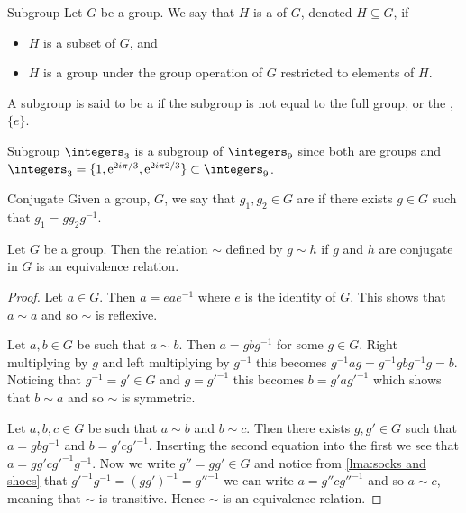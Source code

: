 \documentclass[fleqn]{NotesClass}
\newcommand{\subgroupeq}{\subseteq}
\newcommand*{\e}{\mathrm{e}}
\begin{document}
    \begin{dfn}{Subgroup}{}
        Let \(G\) be a group.
        We say that \(H\) is a  of \(G\), denoted \(H \subgroupeq G\), if
        \begin{itemize}
            \item \(H\) is a subset of \(G\), and
            \item \(H\) is a group under the group operation of \(G\) restricted to elements of \(H\).
        \end{itemize}
        A subgroup is said to be a  if the subgroup is not equal to the full group, or the , \(\{e\}\).
    \end{dfn}
    
    \begin{exm}{Subgroup}{}
        \(\integers_3\) is a subgroup of \(\integers_9\) since both are groups and \(\integers_3 = \{1, \e^{2i\pi/3}, \e^{2i\pi 2/3}\} \subset \integers_9\).
    \end{exm}
    
    \begin{dfn}{Conjugate}{}
        Given a group, \(G\), we say that \(g_1, g_2 \in G\) are  if there exists \(g \in G\) such that \(g_1 = gg_2g^{-1}\).
    \end{dfn}
    
    \begin{lma}{}{}
        Let \(G\) be a group.
        Then the relation \(\sim\) defined by \(g \sim h\) if \(g\) and \(h\) are conjugate in \(G\) is an equivalence relation.
        \begin{proof}
            Let \(a \in G\).
            Then \(a = eae^{-1}\) where \(e\) is the identity of \(G\).
            This shows that \(a \sim a\) and so \(\sim\) is reflexive.
            
            Let \(a, b \in G\) be such that \(a \sim b\).
            Then \(a = gbg^{-1}\) for some \(g \in G\).
            Right multiplying by \(g\) and left multiplying by \(g^{-1}\) this becomes \(g^{-1}ag = g^{-1}gbg^{-1}g = b\).
            Noticing that \(g^{-1} = g' \in G\) and \(g = g'^{-1}\) this becomes \(b = g'ag'^{-1}\) which shows that \(b \sim a\) and so \(\sim\) is symmetric.
            
            Let \(a, b, c \in G\) be such that \(a \sim b\) and \(b \sim c\).
            Then there exists \(g, g' \in G\) such that \(a = gbg^{-1}\) and \(b = g'cg'^{-1}\).
            Inserting the second equation into the first we see that \(a = gg'cg'^{-1}g^{-1}\).
            Now we write \(g'' = gg' \in G\) and notice from \cref{lma:socks and shoes} that \(g'^{-1}g^{-1} = (gg')^{-1} = g''^{-1}\) we can write \(a = g''cg''^{-1}\) and so \(a \sim c\), meaning that \(\sim\) is transitive.
            Hence \(\sim\) is an equivalence relation.
        \end{proof}
    \end{lma}
    
\end{document}
